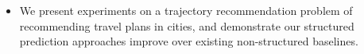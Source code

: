\begin{itemize}[noitemsep,leftmargin=12pt]
	\item We present experiments on a trajectory recommendation problem of recommending travel plans in cities, and demonstrate our structured prediction approaches improve over existing non-structured baselines. %
\end{itemize}

